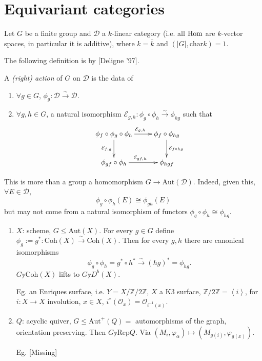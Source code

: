 \section{Equivariant categories}
\label{section-equivariant-categories}

Let $G$ be a finite group and $\mathcal{D}$ a
$k$-linear category (i.e. all $\mathop{\mathrm{Hom}}\nolimits$ are
$k$-vector spaces, in particular it is
additive), where $k=\bar{k}$ and
$(|G|,\text{char}k)=1$.

The following definition is by [Deligne '97].

\begin{definition}
\label{definition-group-action}
A {\it (right) action} of $G$ on
$\mathcal{D}$ is the data of
\begin{enumerate}
\item $\forall g \in G$,
$\phi_g:\mathcal{D}\xrightarrow{\sim}
\mathcal{D}$.
\item $\forall g,h\in G$, a natural
isomorphism
$\mathcal{E}_{g,h}:\phi_g\circ \phi_h
\xrightarrow{\sim}\phi_{hg}$ such that
$$
\xymatrix{
\phi_f \circ\phi_g \circ\phi_h
\ar[r]^{\mathcal{E}_{g,h}}\ar[d]_{\mathcal{E}
_{f,g}}&\phi_f
\circ \phi_{hg}
\ar[d]^{\mathcal{E}_{f \circ hg}}\\
\phi_{gf}\circ
\phi_h\ar[r]^{\mathcal{E}_{gf,h}}&\phi_{hgf}
}
$$
\end{enumerate}
\end{definition}

\begin{remark}
\label{remark-more-than-a-homomorphism}
This is more than a group a homomorphism $G
\to \text{Aut}(\mathcal{D})$. Indeed, given
this, $\forall E \in \mathcal{D}$,
$$
\phi_g \circ \phi_h(E)\cong \phi_{gh}(E)
$$
but may not come from a natural isomorphism
of functors
$\phi_g\circ\phi_h\cong\phi_{hg}$.
\end{remark}

\begin{example}
\label{example-group-actions}
\begin{enumerate}
\item $X$: scheme, $G \leq \text{Aut}(X)$.
For every $g \in G$ define
$\phi_g:=g^*
:\text{Coh}(X)\xrightarrow{\sim}\text{Coh}(X)
$.
Then for every $g,h$ there are canonical
isomorphisms
$$
\phi_g \circ\phi_h=g^*\circ
h^*\xrightarrow{\sim}(hg)^* =\phi_{hg}.
$$
$G \mathbb{y} \text{Coh}(X)$ lifts to
$G\mathbb{y}D^b(X)$.

Eg. an Enriques surface, i.e.
$Y=X/\mathbb{Z}/2\mathbb{Z}$, $X$ a K3
surface,
$\mathbb{Z}/2\mathbb{Z}=\left\langle{}i\right\rangle{}$, for
$i:X\to X$ involution, $x
\in X$, $i^*
(\mathcal{O}_x)=\mathcal{O}_{i^{-1}(x)}$.

\item $Q$: acyclic quiver, $G\leq
\text{Aut}^+(Q)=$ automorphisms of the
graph, orientation preserving. Then
$G\mathbb{y}\text{Rep}Q$. Via
$(M_i,\varphi_\alpha)\mapsto
(M_{g(i)},\varphi_{g(x)})$.

Eg. [Missing]
\end{enumerate}
\end{example}

